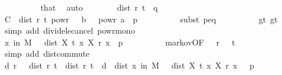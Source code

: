 \begin{isabellebody}
\ \ \ \ \ \ \ \ \isamarkupfalse%
\ that\ \isamarkupfalse%
\ auto\isanewline
\ \ \ \ \ \ \isamarkupfalse%
\ {\isacartoucheopen}dist\ r\ t\ {\isacharless}{\kern0pt}\ {\isacharquery}{\kern0pt}q{\isacartoucheclose}\ \isamarkupfalse%
\ {\isachardoublequoteopen}C\ {\isacharasterisk}{\kern0pt}\ dist\ r\ t\ powr\ {\isacharparenleft}{\kern0pt}{}\ {\isacharplus}{\kern0pt}\ b{\isacharparenright}{\kern0pt}\ {\isacharslash}{\kern0pt}\ {\isasymepsilon}\ powr\ a\ {\isasymle}\ p{\isachardoublequoteclose}\isanewline
\ \ \ \ \ \ \ \ \isamarkupfalse%
\ {\isacharparenleft}{\kern0pt}subst\ p{\isacharunderscore}{\kern0pt}eq{\isacharparenright}{\kern0pt}\isanewline
\ \ \ \ \ \ \ \ \isamarkupfalse%
\ gt{\isacharunderscore}{\kern0pt}{}{\isacharparenleft}{\kern0pt}{}{\isacharparenright}{\kern0pt}\ gt{\isacharunderscore}{\kern0pt}{}{\isacharparenleft}{\kern0pt}{}{\isacharparenright}{\kern0pt}\ \isamarkupfalse%
\ {\isacharparenleft}{\kern0pt}simp\ add{\isacharcolon}{\kern0pt}\ divide{\isacharunderscore}{\kern0pt}le{\isacharunderscore}{\kern0pt}cancel\ powr{\isacharunderscore}{\kern0pt}mono{}{\isacharparenright}{\kern0pt}\isanewline
\ \ \ \ \ \ \ \ \isamarkupfalse%
\isanewline
\ \ \ \ \ \ \isamarkupfalse%
\ \isamarkupfalse%
\ {\isachardoublequoteopen}{\isasymP}{\isacharparenleft}{\kern0pt}x\ in\ {\isacharquery}{\kern0pt}M{\isachardot}{\kern0pt}\ {\isasymepsilon}\ {\isasymle}\ dist\ {\isacharparenleft}{\kern0pt}X\ t\ x{\isacharparenright}{\kern0pt}\ {\isacharparenleft}{\kern0pt}X\ r\ x{\isacharparenright}{\kern0pt}{\isacharparenright}{\kern0pt}\ {\isasymle}\ p{\isachardoublequoteclose}\isanewline
\ \ \ \ \ \ \ \ \isamarkupfalse%
\ markov{\isacharbrackleft}{\kern0pt}OF\ {\isacartoucheopen}{}\ {\isasymle}\ r{\isacartoucheclose}\ {\isacartoucheopen}{}\ {\isasymle}\ t{\isacartoucheclose}\ {\isacartoucheopen}{}\ {\isacharless}{\kern0pt}\ {\isasymepsilon}{\isacartoucheclose}{\isacharbrackright}{\kern0pt}\ \isamarkupfalse%
\ {\isacharparenleft}{\kern0pt}simp\ add{\isacharcolon}{\kern0pt}\ dist{\isacharunderscore}{\kern0pt}commute{\isacharparenright}{\kern0pt}\isanewline
\ \ \ \ \isamarkupfalse%
\isanewline
\ \ \ \ \isamarkupfalse%
\ \isamarkupfalse%
\ {\isachardoublequoteopen}{\isasymexists}d{\isachargreater}{\kern0pt}{}{\isachardot}{\kern0pt}\ {\isasymforall}r{\isasymin}{\isacharbraceleft}{\kern0pt}{}{\isachardot}{\kern0pt}{\isachardot}{\kern0pt}{\isacharbraceright}{\kern0pt}{\isachardot}{\kern0pt}\ {}\ {\isacharless}{\kern0pt}\ dist\ r\ t\ {\isasymand}\ dist\ r\ t\ {\isacharless}{\kern0pt}\ d\ {\isasymlongrightarrow}\ dist\ {\isasymP}{\isacharparenleft}{\kern0pt}x\ in\ {\isacharquery}{\kern0pt}M{\isachardot}{\kern0pt}\ {\isasymepsilon}\ {\isasymle}\ dist\ {\isacharparenleft}{\kern0pt}X\ t\ x{\isacharparenright}{\kern0pt}\ {\isacharparenleft}{\kern0pt}X\ r\ x{\isacharparenright}{\kern0pt}{\isacharparenright}{\kern0pt}\ {}\ {\isasymle}\ p{\isachardoublequoteclose}\isanewline

\end{isabellebody}
